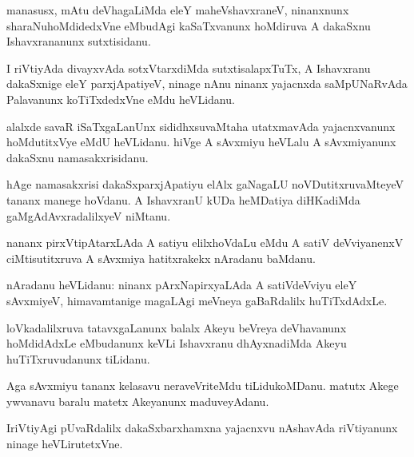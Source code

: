 \documentclass{article}
\begin{document}
\begin{mn}%
manasusx, mAtu deVhagaLiMda eleY maheVshavxraneV, ninanxnunx
sharaNuhoMdidedxVne eMbudAgi kaSaTxvanunx hoMdiruva A dakaSxnu
Ishavxrananunx sutxtisidanu.
\end{mn}

\begin{mn}
I riVtiyAda divayxvAda sotxVtarxdiMda sutxtisalapxTuTx, A Ishavxranu
dakaSxnige eleY parxjApatiyeV, ninage nAnu ninanx yajacnxda
saMpUNaRvAda Palavanunx koTiTxdedxVne eMdu heVLidanu.
\end{mn}

\begin{mn}
alalxde savaR iSaTxgaLanUnx sididhxsuvaMtaha utatxmavAda yajacnxvanunx
hoMdutitxVye eMdU heVLidanu. hiVge A sAvxmiyu heVLalu A sAvxmiyanunx
dakaSxnu namasakxrisidanu.
\end{mn}

\begin{mn}
hAge namasakxrisi dakaSxparxjApatiyu elAlx gaNagaLU
noVDutitxruvaMteyeV tananx manege hoVdanu. A IshavxranU kUDa heMDatiya
diHKadiMda gaMgAdAvxradalilxyeV niMtanu.
\end{mn}

\begin{mn}
nananx pirxVtipAtarxLAda A satiyu elilxhoVdaLu eMdu A satiV
deVviyanenxV ciMtisutitxruva A sAvxmiya hatitxrakekx nAradanu baMdanu.
\end{mn}

\begin{mn}
nAradanu heVLidanu: ninanx pArxNapirxyaLAda A satiVdeVviyu eleY
sAvxmiyeV, himavamtanige magaLAgi meVneya gaBaRdalilx huTiTxdAdxLe.
\end{mn}

\begin{mn}%
loVkadalilxruva tatavxgaLanunx balalx Akeyu beVreya deVhavanunx
hoMdidAdxLe eMbudanunx keVLi Ishavxranu dhAyxnadiMda Akeyu
huTiTxruvudanunx tiLidanu.
\end{mn}

\begin{mn}
Aga sAvxmiyu tananx kelasavu neraveVriteMdu tiLidukoMDanu. matutx
Akege ywvanavu baralu matetx Akeyanunx maduveyAdanu.
\end{mn}

\begin{mn}
IriVtiyAgi pUvaRdalilx dakaSxbarxhamxna yajacnxvu nAshavAda
riVtiyanunx ninage heVLirutetxVne.
\end{mn}

%
%
\end{document}
